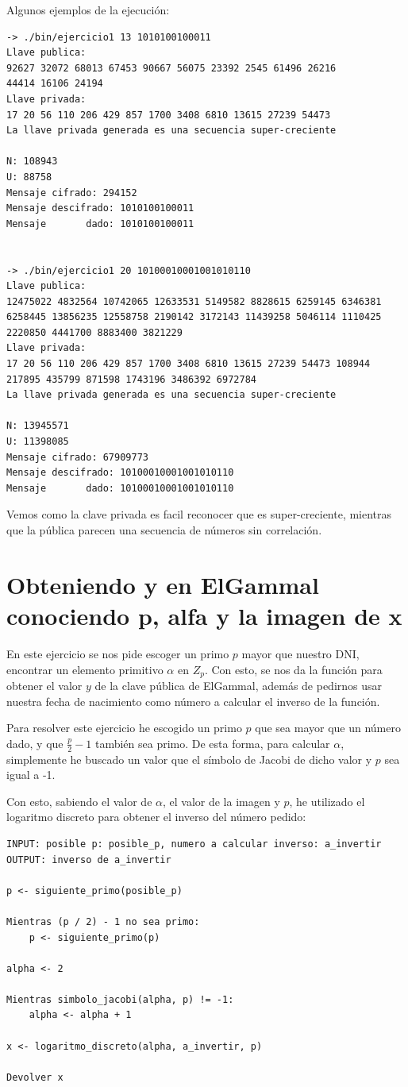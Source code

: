 \documentclass[12pt, spanish]{article}
\begin{document}
Algunos ejemplos de la ejecución:

\begin{lstlisting}
-> ./bin/ejercicio1 13 1010100100011
Llave publica:
92627 32072 68013 67453 90667 56075 23392 2545 61496 26216
44414 16106 24194
Llave privada:
17 20 56 110 206 429 857 1700 3408 6810 13615 27239 54473
La llave privada generada es una secuencia super-creciente

N: 108943
U: 88758
Mensaje cifrado: 294152
Mensaje descifrado: 1010100100011
Mensaje       dado: 1010100100011


-> ./bin/ejercicio1 20 10100010001001010110
Llave publica:
12475022 4832564 10742065 12633531 5149582 8828615 6259145 6346381
6258445 13856235 12558758 2190142 3172143 11439258 5046114 1110425
2220850 4441700 8883400 3821229
Llave privada:
17 20 56 110 206 429 857 1700 3408 6810 13615 27239 54473 108944
217895 435799 871598 1743196 3486392 6972784
La llave privada generada es una secuencia super-creciente

N: 13945571
U: 11398085
Mensaje cifrado: 67909773
Mensaje descifrado: 10100010001001010110
Mensaje       dado: 10100010001001010110
\end{lstlisting}

Vemos como la clave privada es facil reconocer que es super-creciente, mientras que la pública parecen una secuencia de números sin correlación.

\section{Obteniendo y en ElGammal conociendo p, alfa y la imagen de x}

En este ejercicio se nos pide escoger un primo $p$ mayor que nuestro DNI, encontrar un elemento primitivo $\alpha$ en $Z_p$. Con esto, se nos da la función para obtener el valor $y$ de la clave pública de ElGammal, además de pedirnos usar nuestra fecha de nacimiento como número a calcular el inverso de la función.

Para resolver este ejercicio he escogido un primo $p$ que sea mayor que un número dado, y que $\frac{p}{2} - 1$ también sea primo. De esta forma, para calcular $\alpha$, simplemente he buscado un valor que el símbolo de Jacobi de dicho valor y $p$ sea igual a -1.

Con esto, sabiendo el valor de $\alpha$, el valor de la imagen y $p$, he utilizado el logaritmo discreto para obtener el inverso del número pedido:

\begin{lstlisting}[caption={Ejercicio 2}]
INPUT: posible p: posible_p, numero a calcular inverso: a_invertir
OUTPUT: inverso de a_invertir

p <- siguiente_primo(posible_p)

Mientras (p / 2) - 1 no sea primo:
	p <- siguiente_primo(p)

alpha <- 2

Mientras simbolo_jacobi(alpha, p) != -1:
	alpha <- alpha + 1

x <- logaritmo_discreto(alpha, a_invertir, p)

Devolver x
\end{lstlisting}
\end{document}
